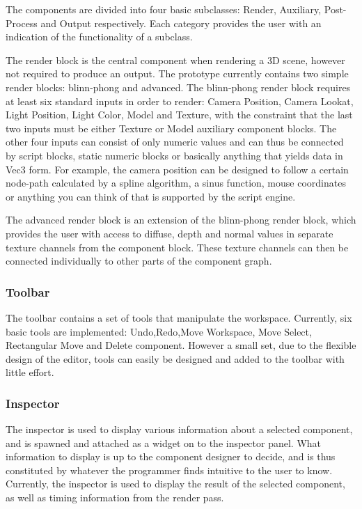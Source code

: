 The components are divided into four basic subclasses: Render, Auxiliary, Post-Process and Output respectively. Each category provides the user with an indication of the functionality of a subclass. 

The render block is the central component when rendering a 3D scene, however not required to produce an output. The prototype currently contains two simple render blocks: blinn-phong and advanced. The blinn-phong render block requires at least six standard inputs in order to render: Camera Position, Camera Lookat, Light Position, Light Color, Model and Texture, with the constraint that the last two inputs must be either Texture or Model auxiliary component blocks. The other four inputs can consist of only numeric values and can thus be connected by script blocks, static numeric blocks or basically anything that yields data in Vec3 form. For example, the camera position can be designed to follow a certain node-path calculated by a spline algorithm, a sinus function, mouse coordinates or anything you can think of that is supported by the script engine. 

The advanced render block is an extension of the blinn-phong render block, which provides the user with access to diffuse, depth and normal values in separate texture channels from the component block. These texture channels can then be connected individually to other parts of the component graph.

\subsubsection{Toolbar}
The toolbar contains a set of tools that manipulate the workspace. Currently, six basic tools are implemented: Undo,Redo,Move Workspace, Move Select, Rectangular Move and Delete component. However a small set, due to the flexible design of the editor, tools can easily be designed and added to the toolbar with little effort.

\subsubsection{Inspector}
The inspector is used to display various information about a selected component, and is spawned and attached as a widget on to the inspector panel. What information to display is up to the component designer to decide, and is thus constituted by whatever the programmer finds intuitive to the user to know. Currently, the inspector is used to display the result of the selected component, as well as timing information from the render pass.

